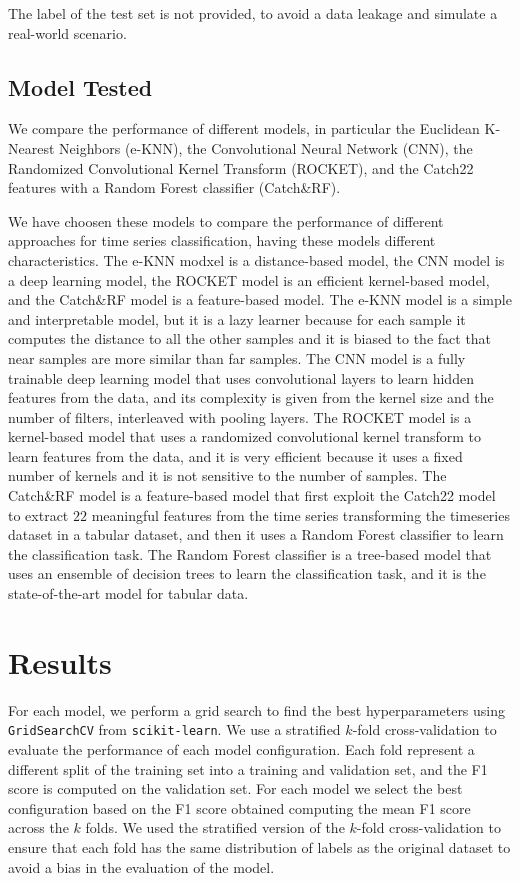 \documentclass[a4paper,11pt]{article}
\begin{document}
The label of the test set is not provided, to avoid a data leakage and simulate a real-world scenario.

\subsection{Model Tested}
We compare the performance of different models, in particular the Euclidean K-Nearest Neighbors (e-KNN),
the Convolutional Neural Network (CNN), the Randomized Convolutional Kernel Transform (ROCKET),
and the Catch22 features with a Random Forest classifier (Catch\&RF).

We have choosen these models to compare the performance of different approaches for time series classification,
having these models different characteristics. The e-KNN modxel is a distance-based model,
the CNN model is a deep learning model, the ROCKET model is an efficient kernel-based model,
and the Catch\&RF model is a feature-based model.
The e-KNN model is a simple and interpretable model, but it is a lazy learner
because for each sample it computes the distance to all the other samples and it is biased
to the fact that near samples are more similar than far samples.
The CNN model is a fully trainable deep learning model that uses convolutional layers to learn hidden features from the data,
and its complexity is given from the kernel size and the number of filters, interleaved with pooling layers.
The ROCKET model is a kernel-based model that uses a randomized convolutional kernel transform to learn features from the data,
and it is very efficient because it uses a fixed number of kernels and it is not sensitive to the number of samples.
The Catch\&RF model is a feature-based model that first exploit the Catch22 model to extract $22$ meaningful features from the time series transforming
the timeseries dataset in a tabular dataset,
and then it uses a Random Forest classifier to learn the classification task.
The Random Forest classifier is a tree-based model that uses an ensemble of decision trees to learn the classification task, and it is
the state-of-the-art model for tabular data. 

\section{Results}\label{sec:results}
For each model, we perform a grid search to find the best hyperparameters using \texttt{GridSearchCV} from \texttt{scikit-learn}.
We use a stratified $k$-fold cross-validation to evaluate the performance of each model configuration.
Each fold represent a different split of the training set into a training and validation set,
and the F1 score is computed on the validation set.
For each model we select the best configuration based on the F1 score obtained computing the mean F1 score across the $k$ folds.
We used the stratified version of the $k$-fold cross-validation to ensure that each fold has the same distribution of labels as the original dataset
to avoid a bias in the evaluation of the model.
\end{document}

